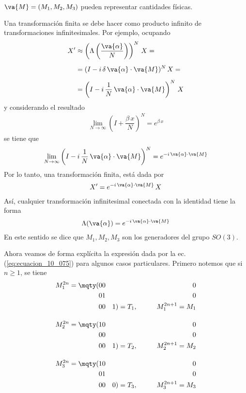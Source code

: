 $\va{M} = (M_{1} , M_{2} , M_{3})$ pueden representar cantidades físicas.
\par
Una transformación finita se debe hacer como producto infinito de transformaciones infinitesimales. Por ejemplo, ocupando
\begin{align}
X^{\prime} &\approx \left( \Lambda \left( \dfrac{\va{\alpha}}{N} \right) \right)^{N} \, X = \nonumber \\[0.5em]
&= (I - i \, \delta \, \va{\alpha} \cdot \va{M})^{N} \, X = \nonumber \\[0.5em]
&= \left( I - i \, \dfrac{1}{N} \, \va{\alpha} \cdot \va{M} \right)^{N} \, X \label{eq:ecuacion_10_071}
\end{align}
y considerando el resultado
\begin{align}
\lim_{N \to \infty} \left(  I + \dfrac{\beta \, x}{N} \right)^{N} = e^{\beta \, x}
\label{eq:ecuacion_10_072}
\end{align}
se tiene que
\begin{align}
\lim_{N \to \infty} \left(  I - i \, \dfrac{1}{N} \, \va{\alpha} \cdot \va{M} \right)^{N} = e^{- i \, \va{\alpha} \cdot \va{M}}
\label{eq:ecuacion_10_073}
\end{align}
Por lo tanto, una transformación finita, está dada por
\begin{align}
X^{\prime} = e^{- i \, \va{\alpha} \cdot \va{M}} \, X
\label{eq:ecuacion_10_074}
\end{align}
Así, cualquier transformación infinitesimal conectada con la identidad tiene la forma
\begin{align}
\Lambda (\va{\alpha}) = e^{- i \, \va{\alpha} \cdot \va{M}}
\label{eq:ecuacion_10_075}
\end{align}
En este sentido se dice que $M_{1}, M_{2}, M_{3}$ son los generadores del grupo $SO(3)$.
\par
Ahora veamos de forma explícita la expresión dada por la ec.(\ref{eq:ecuacion_10_075}) para algunos casos particulares. Primero notemos que si $n \geq 1$, se tiene
\begin{align}
M_{1}^{2n} = \mqty(0 & 0 & 0 \\ 0 & 1 & 0 \\ 0 & 0 & 1) = T_{1}, \hspace{1cm} M_{1}^{2n + 1} = M_{1}  \label{eq:ecuacion_10_076} \\[1em]
M_{2}^{2n} = \mqty(1 & 0 & 0 \\ 0 & 0 & 0 \\ 0 & 0 & 1) = T_{2}, \hspace{1cm} M_{2}^{2n + 1} = M_{2}  \label{eq:ecuacion_10_077} \\[1em]
M_{3}^{2n} = \mqty(1 & 0 & 0 \\ 0 & 1 & 0 \\ 0 & 0 & 0) = T_{3}, \hspace{1cm} M_{3}^{2n + 1} = M_{3}  \label{eq:ecuacion_10_078}
\end{align}
